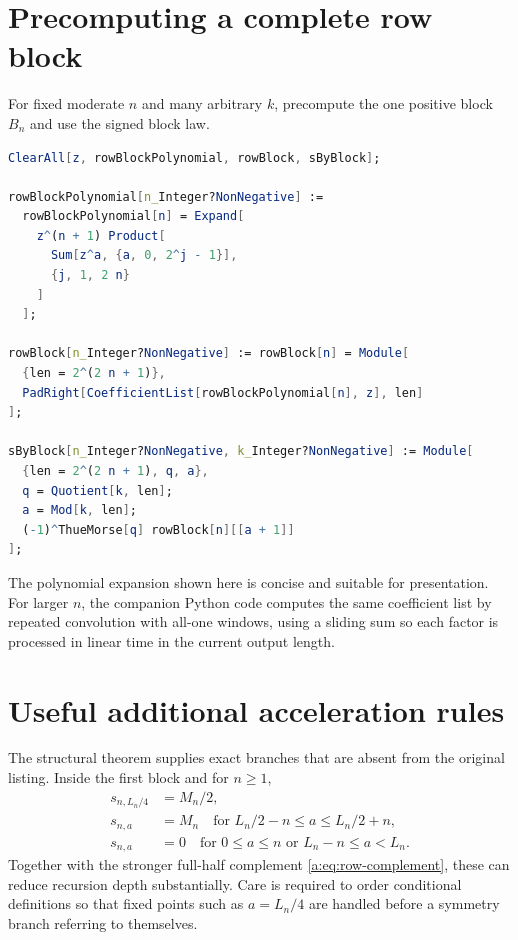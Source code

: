 \documentclass[11pt,a4paper,oneside,openany]{book}
\numberwithin{equation}{chapter}
\theoremstyle{definition}
\theoremstyle{remark}
\begin{document}
\section{Precomputing a complete row block}

For fixed moderate \(n\) and many arbitrary \(k\), precompute the one positive
block \(B_n\) and use the signed block law.

\begin{lstlisting}[language=Mathematica,caption={Block-based exact table lookup.}]
ClearAll[z, rowBlockPolynomial, rowBlock, sByBlock];

rowBlockPolynomial[n_Integer?NonNegative] :=
  rowBlockPolynomial[n] = Expand[
    z^(n + 1) Product[
      Sum[z^a, {a, 0, 2^j - 1}],
      {j, 1, 2 n}
    ]
  ];

rowBlock[n_Integer?NonNegative] := rowBlock[n] = Module[
  {len = 2^(2 n + 1)},
  PadRight[CoefficientList[rowBlockPolynomial[n], z], len]
];

sByBlock[n_Integer?NonNegative, k_Integer?NonNegative] := Module[
  {len = 2^(2 n + 1), q, a},
  q = Quotient[k, len];
  a = Mod[k, len];
  (-1)^ThueMorse[q] rowBlock[n][[a + 1]]
];
\end{lstlisting}

The polynomial expansion shown here is concise and suitable for presentation.
For larger \(n\), the companion Python code computes the same coefficient list
by repeated convolution with all-one windows, using a sliding sum so each
factor is processed in linear time in the current output length.

\section{Useful additional acceleration rules}

The structural theorem supplies exact branches that are absent from the
original listing.  Inside the first block and for \(n\ge1\),
\begin{align}
 s_{n,L_n/4}&=M_n/2,
 \label{a:eq:wl-quarter-rule}\\
 s_{n,a}&=M_n
 \quad\text{for }L_n/2-n\le a\le L_n/2+n,
 \label{a:eq:wl-plateau-rule}\\
 s_{n,a}&=0
 \quad\text{for }0\le a\le n
 \text{ or }L_n-n\le a<L_n.
 \label{a:eq:wl-zero-rule}
\end{align}
Together with the stronger full-half complement
\eqref{a:eq:row-complement}, these can reduce recursion depth substantially.
Care is required to order conditional definitions so that fixed points such as
\(a=L_n/4\) are handled before a symmetry branch referring to themselves.
\end{document}
